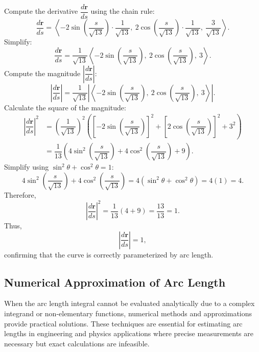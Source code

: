 \begin{example}
\begin{solution}
\begin{enumerate}
    Compute the derivative \( \dfrac{d\mathbf{r}}{ds} \) using the chain rule:
    \[
    \dfrac{d\mathbf{r}}{ds} = \left\langle -2\sin\left( \dfrac{s}{\sqrt{13}} \right) \cdot \dfrac{1}{\sqrt{13}},\ 
    2\cos\left( \dfrac{s}{\sqrt{13}} \right) \cdot \dfrac{1}{\sqrt{13}},\ \dfrac{3}{\sqrt{13}} \right\rangle.
    \]
    Simplify:
    \[
    \dfrac{d\mathbf{r}}{ds} = \dfrac{1}{\sqrt{13}} \left\langle -2\sin\left( \dfrac{s}{\sqrt{13}} \right),\ 
    2\cos\left( \dfrac{s}{\sqrt{13}} \right),\ 3 \right\rangle.
    \]
    Compute the magnitude \( \left| \dfrac{d\mathbf{r}}{ds} \right| \):
    \[
    \left| \dfrac{d\mathbf{r}}{ds} \right| = \dfrac{1}{\sqrt{13}} \left| \left\langle -2\sin\left( \dfrac{s}{\sqrt{13}} \right),\ 
    2\cos\left( \dfrac{s}{\sqrt{13}} \right),\ 3 \right\rangle \right|.
    \]
    Calculate the square of the magnitude:
    \begin{align*}
    \left| \dfrac{d\mathbf{r}}{ds} \right|^2 &= \left( \dfrac{1}{\sqrt{13}} \right)^2 \left( [ -2\sin\left( \dfrac{s}{\sqrt{13}} \right) ]^2 + [ 2\cos\left( \dfrac{s}{\sqrt{13}} \right) ]^2 + 3^2 \right) \\
    &= \dfrac{1}{13} \left( 4\sin^2\left( \dfrac{s}{\sqrt{13}} \right) + 4\cos^2\left( \dfrac{s}{\sqrt{13}} \right) + 9 \right).
    \end{align*}
    Simplify using \( \sin^2 \theta + \cos^2 \theta = 1 \):
    \[
    4\sin^2\left( \dfrac{s}{\sqrt{13}} \right) + 4\cos^2\left( \dfrac{s}{\sqrt{13}} \right) = 4( \sin^2\theta + \cos^2\theta ) = 4(1) = 4.
    \]
    Therefore,
    \[
    \left| \dfrac{d\mathbf{r}}{ds} \right|^2 = \dfrac{1}{13} (4 + 9) = \dfrac{13}{13} = 1.
    \]
    Thus,
    \[
    \left| \dfrac{d\mathbf{r}}{ds} \right| = 1,
    \]
    confirming that the curve is correctly parameterized by arc length.
\end{enumerate}
\end{solution}
\end{example}
\exampleline



\subsection*{Numerical Approximation of Arc Length} 

\noindent When the arc length integral cannot be evaluated analytically due to a complex integrand or non-elementary functions, numerical methods and approximations provide practical solutions. These techniques are essential for estimating arc lengths in engineering and physics applications where precise measurements are necessary but exact calculations are infeasible.

